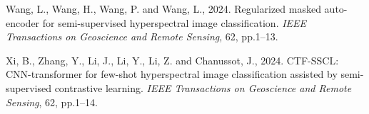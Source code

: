 \documentclass[pdflatex,sn-mathphys-num]{sn-jnl}
\begin{document}
\begin{thebibliography}{}
Wang, L., Wang, H., Wang, P. and Wang, L., 2024.
Regularized masked auto-encoder for semi-supervised hyperspectral image classification.
\textit{IEEE Transactions on Geoscience and Remote Sensing}, 62, pp.1--13.

Xi, B., Zhang, Y., Li, J., Li, Y., Li, Z. and Chanussot, J., 2024.
CTF-SSCL: CNN-transformer for few-shot hyperspectral image classification assisted by semi-supervised contrastive learning.
\textit{IEEE Transactions on Geoscience and Remote Sensing}, 62, pp.1--14.

\end{thebibliography}
\end{document}
